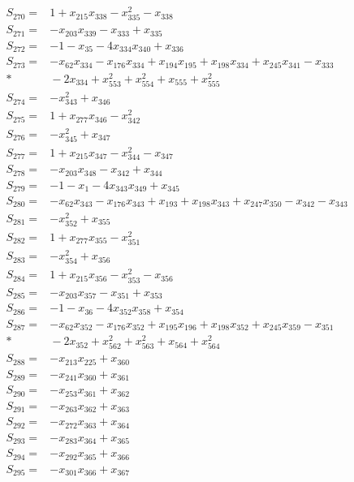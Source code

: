 \begin{align*}
S_{270}={}&1+x_{215}x_{338}-x_{335}^{2}-x_{338}\\[3pt]
S_{271}={}&-x_{203}x_{339}-x_{333}+x_{335}\\[3pt]
S_{272}={}&-1-x_{35}-4x_{334}x_{340}+x_{336}\\[3pt]
S_{273}={}&-x_{62}x_{334}-x_{176}x_{334}+x_{194}x_{195}+x_{198}x_{334}+x_{245}x_{341}-x_{333}\\*
&{}-2x_{334}+x_{553}^{2}+x_{554}^{2}+x_{555}+x_{555}^{2}\\[3pt]
S_{274}={}&-x_{343}^{2}+x_{346}\\[3pt]
S_{275}={}&1+x_{277}x_{346}-x_{342}^{2}\\[3pt]
S_{276}={}&-x_{345}^{2}+x_{347}\\[3pt]
S_{277}={}&1+x_{215}x_{347}-x_{344}^{2}-x_{347}\\[3pt]
S_{278}={}&-x_{203}x_{348}-x_{342}+x_{344}\\[3pt]
S_{279}={}&-1-x_{1}-4x_{343}x_{349}+x_{345}\\[3pt]
S_{280}={}&-x_{62}x_{343}-x_{176}x_{343}+x_{193}+x_{198}x_{343}+x_{247}x_{350}-x_{342}-x_{343}\\[3pt]
S_{281}={}&-x_{352}^{2}+x_{355}\\[3pt]
S_{282}={}&1+x_{277}x_{355}-x_{351}^{2}\\[3pt]
S_{283}={}&-x_{354}^{2}+x_{356}\\[3pt]
S_{284}={}&1+x_{215}x_{356}-x_{353}^{2}-x_{356}\\[3pt]
S_{285}={}&-x_{203}x_{357}-x_{351}+x_{353}\\[3pt]
S_{286}={}&-1-x_{36}-4x_{352}x_{358}+x_{354}\\[3pt]
S_{287}={}&-x_{62}x_{352}-x_{176}x_{352}+x_{195}x_{196}+x_{198}x_{352}+x_{245}x_{359}-x_{351}\\*
&{}-2x_{352}+x_{562}^{2}+x_{563}^{2}+x_{564}+x_{564}^{2}\\[3pt]
S_{288}={}&-x_{213}x_{225}+x_{360}\\[3pt]
S_{289}={}&-x_{241}x_{360}+x_{361}\\[3pt]
S_{290}={}&-x_{253}x_{361}+x_{362}\\[3pt]
S_{291}={}&-x_{263}x_{362}+x_{363}\\[3pt]
S_{292}={}&-x_{272}x_{363}+x_{364}\\[3pt]
S_{293}={}&-x_{283}x_{364}+x_{365}\\[3pt]
S_{294}={}&-x_{292}x_{365}+x_{366}\\[3pt]
S_{295}={}&-x_{301}x_{366}+x_{367}\\[3pt]

\end{align*}
